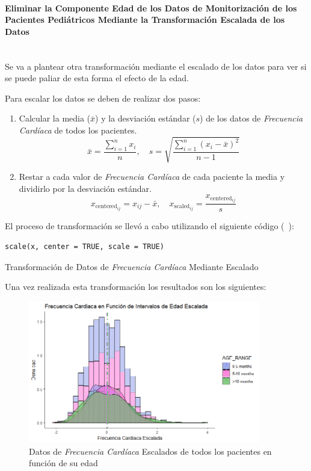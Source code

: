\paragraph{Eliminar la Componente Edad de los Datos de Monitorización de los Pacientes Pediátricos Mediante la Transformación Escalada de los Datos}\label{sec:eliminar-edad-2} \\

Se va a plantear otra transformación mediante el escalado de los datos para ver si se puede paliar de esta forma el efecto de la edad. 

Para escalar los datos se deben de realizar dos pasos:

\begin{enumerate}
    \item Calcular la media (\(\bar{x}\)) y la desviación estándar (\(s\)) de los datos de \textit{Frecuencia Cardíaca} de todos los pacientes.
    \[
        \bar{x} = \frac{\sum_{i=1}^{n} x_i}{n}, \quad s = \sqrt{\frac{\sum_{i=1}^{n} (x_i - \bar{x})^2}{n-1}}
    \]

    \item Restar a cada valor de \textit{Frecuencia Cardíaca} de cada paciente la media y dividirlo por la desviación estándar.
    \[
        x_{\text{centered}_{ij}} = x_{ij} - \bar{x}, \quad x_{\text{scaled}_{ij}} = \frac{x_{\text{centered}_{ij}}}{s}
    \]
\end{enumerate}

El proceso de transformación se llevó a cabo utilizando el siguiente código (~\cite{BeckerChambersWilks1988}):

\begin{code}[H]
    \begin{lstlisting}
scale(x, center = TRUE, scale = TRUE)
    \end{lstlisting}
    \caption{Transformación de Datos de \textit{Frecuencia Cardíaca} Mediante Escalado}\label{cod:transformacion-fc-escalado}
 \end{code}


Una vez realizada esta transformación los resultados son los siguientes: 


\begin{figure}[H]
    \centering
    \includegraphics[width=0.9\textwidth]{img/frecuencia-cardiaca-edad-escalada.png}
    \caption{Datos de \textit{Frecuencia Cardíaca} Escalados de todos los pacientes en función de su edad}
    \label{fig:frecuencia-cardiaca-edad-escala}
\end{figure}

